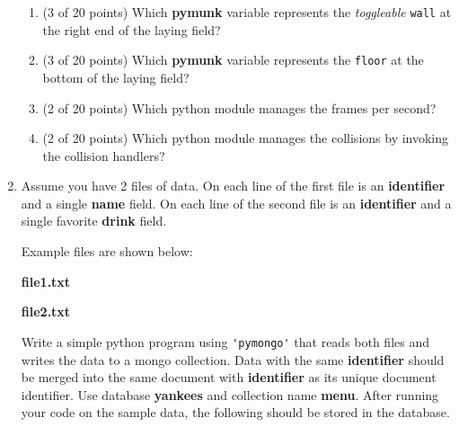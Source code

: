 \documentclass[10pt]{article}
\begin{document}
\begin{enumerate}
\begin{enumerate}
			\item (3 of 20 points) Which \textbf{pymunk} variable represents the \textit{toggleable} \verb|wall| at 
				the right end of the laying field?
				\bigskip
				\bigskip
				\bigskip
				\bigskip
				\bigskip
				\bigskip
				\bigskip
				\bigskip
				\bigskip
				\bigskip

			\item (3 of 20 points) Which \textbf{pymunk} variable represents the \verb|floor| at 
				the bottom of the laying field?
				\bigskip
				\bigskip
				\bigskip
				\bigskip
				\bigskip
				\bigskip
				\bigskip
				\bigskip
				\bigskip
				\bigskip

			\item (2 of 20 points) Which python module manages the frames per second?
				\bigskip
				\bigskip
				\bigskip
				\bigskip
				\bigskip
				\bigskip
				\bigskip
				\bigskip
				\bigskip
				\bigskip

			\item (2 of 20 points) Which python module manages the collisions by invoking the 
				collision handlers?
				\bigskip
				\bigskip
				\bigskip
				\bigskip
				\bigskip
				\bigskip
				\bigskip
				\bigskip
				\bigskip
				\bigskip
                \end{enumerate}
		\fi

\newpage

    \item Assume you have 2 files of data. On each line of the first file is an \textbf{identifier} and a 
	    single \textbf{name} field. On each 
	    line of the second file is an \textbf{identifier} and a single favorite \textbf{drink} field. 

	    Example files are shown below:

	    \textbf{file1.txt}

	    

	    \textbf{file2.txt}

	    

	    Write a simple 
	    python program using \verb|'pymongo'| that reads both files and writes the data to a mongo 
	    collection. Data with the same \textbf{identifier} should be merged into the same document with
	    \textbf{identifier} as its unique document identifier. Use database \textbf{yankees} 
	    and collection name \textbf{menu}. After running your code on the sample
	    data, the following should be
	    stored in the database.


\end{enumerate}
\end{document}
